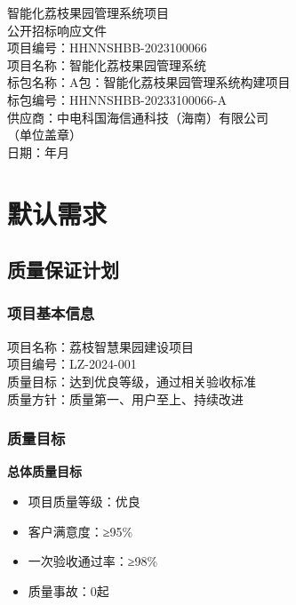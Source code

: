 \documentclass[UTF8,a4paper,zihao=-4]{ctexart}
\newcommand{\BidTitle}{智能化荔枝果园管理系统项目}
\newcommand{\BidDocType}{公开招标响应文件}
\newcommand{\ProjectNo}{HHNNSHBB-2023100066}
\newcommand{\ProjectName}{智能化荔枝果园管理系统}
\newcommand{\PackageName}{A包：智能化荔枝果园管理系统构建项目}
\newcommand{\PackageNo}{HHNNSHBB-20233100066-A}
\newcommand{\SupplierName}{中电科国海信通科技（海南）有限公司}
\newcommand{\BidDate}{\the\year 年\the\month 月}
\begin{document}
\thispagestyle{empty}
\begin{center}
  {\heiti \BidTitle\\[8pt] \BidDocType}\\[36pt]
  {\songti 项目编号：\ProjectNo}\\[8pt]
  {\songti 项目名称：\ProjectName}\\[8pt]
  {\songti 标包名称：\PackageName}\\[8pt]
  {\songti 标包编号：\PackageNo}\\[24pt]
  {\heiti 供应商：\SupplierName}\\[8pt]
  {\songti （单位盖章）}\\[28pt]
  {\songti 日期：\BidDate}
\end{center}
\clearpage

\thispagestyle{empty}
\tableofcontents
\clearpage

\setcounter{page}{1}

\section{默认需求}

\subsection{质量保证计划}

\subsubsection{项目基本信息}
项目名称：荔枝智慧果园建设项目 \\
项目编号：LZ-2024-001 \\
质量目标：达到优良等级，通过相关验收标准 \\
质量方针：质量第一、用户至上、持续改进

\subsubsection{质量目标}
\textbf{总体质量目标}
\begin{itemize}
    \item 项目质量等级：优良
    \item 客户满意度：≥95\%
    \item 一次验收通过率：≥98\%
    \item 质量事故：0起
\end{itemize}
\end{document}

